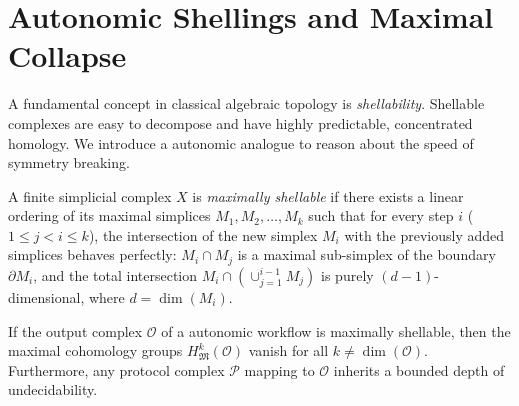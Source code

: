 \section{Autonomic Shellings and Maximal Collapse}

A fundamental concept in classical algebraic topology is \textit{shellability}. Shellable complexes are easy to decompose and have highly predictable, concentrated homology. We introduce a autonomic analogue to reason about the speed of symmetry breaking.

\begin{definition}
A finite simplicial complex $X$ is \textit{maximally shellable} if there exists a linear ordering of its maximal simplices $M_1, M_2, \dots, M_k$ such that for every step $i$ ($1 \le j < i \le k$), the intersection of the new simplex $M_i$ with the previously added simplices behaves perfectly: 
$M_i \cap M_j$ is a maximal sub-simplex of the boundary $\partial M_i$, and the total intersection $M_i \cap (\cup_{j=1}^{i-1} M_j)$ is purely $(d-1)$-dimensional, where $d = \dim(M_i)$.
\end{definition}

\begin{theorem}
If the output complex $\mathcal{O}$ of a autonomic workflow is maximally shellable, then the maximal cohomology groups $H^k_{\mathfrak{M}}(\mathcal{O})$ vanish for all $k \neq \dim(\mathcal{O})$. Furthermore, any protocol complex $\mathcal{P}$ mapping to $\mathcal{O}$ inherits a bounded depth of undecidability.
\end{theorem}

